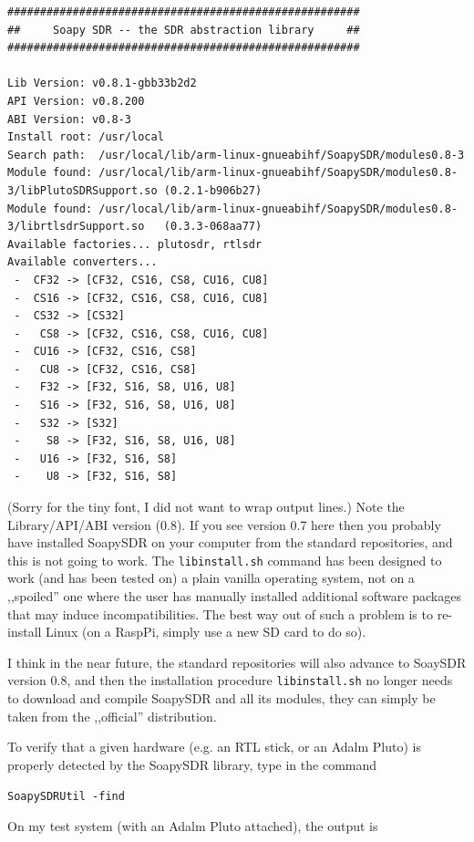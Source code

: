 \documentclass[12pt]{book}
\def\grtt#1{\texttt{\color{magenta}#1}}
\begin{document}
\begin{tiny}
\begin{verbatim}
######################################################
##     Soapy SDR -- the SDR abstraction library     ##
######################################################

Lib Version: v0.8.1-gbb33b2d2
API Version: v0.8.200
ABI Version: v0.8-3
Install root: /usr/local
Search path:  /usr/local/lib/arm-linux-gnueabihf/SoapySDR/modules0.8-3
Module found: /usr/local/lib/arm-linux-gnueabihf/SoapySDR/modules0.8-3/libPlutoSDRSupport.so (0.2.1-b906b27)
Module found: /usr/local/lib/arm-linux-gnueabihf/SoapySDR/modules0.8-3/librtlsdrSupport.so   (0.3.3-068aa77)
Available factories... plutosdr, rtlsdr
Available converters...
 -  CF32 -> [CF32, CS16, CS8, CU16, CU8]
 -  CS16 -> [CF32, CS16, CS8, CU16, CU8]
 -  CS32 -> [CS32]
 -   CS8 -> [CF32, CS16, CS8, CU16, CU8]
 -  CU16 -> [CF32, CS16, CS8]
 -   CU8 -> [CF32, CS16, CS8]
 -   F32 -> [F32, S16, S8, U16, U8]
 -   S16 -> [F32, S16, S8, U16, U8]
 -   S32 -> [S32]
 -    S8 -> [F32, S16, S8, U16, U8]
 -   U16 -> [F32, S16, S8]
 -    U8 -> [F32, S16, S8]
\end{verbatim}
\end{tiny}

(Sorry for the tiny font, I did not want to wrap output lines.)
Note the Library/API/ABI version (0.8). If you see version 0.7 here
then you probably have installed SoapySDR on your computer
from
the standard repositories, and this is not going to work. The \texttt{libinstall.sh} command  has been
designed
to work (and has been tested on) a plain vanilla operating system, not on a ,,spoiled'' one
where the user has manually installed additional software packages that may induce incompatibilities.
The best way out of such a problem is to re-install Linux (on a RaspPi, simply use a new SD card to do so).

I think in the near future, the standard repositories will also advance to SoaySDR version 0.8, and then
the installation procedure \texttt{libinstall.sh} no longer needs to download and compile SoapySDR and all
its modules, they can simply be taken from the ,,official'' distribution.

\clearpage
To verify that a given hardware (e.g. an RTL stick, or an Adalm Pluto) is properly detected by the
SoapySDR library, type in the command

\grtt{SoapySDRUtil -find}

On my test system (with an Adalm Pluto attached), the output is
\end{document}
